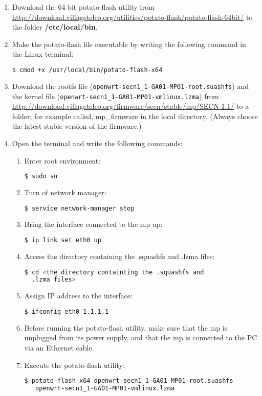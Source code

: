 \begin{enumerate}
\item Download the 64 bit potato-flash utility from \url{http://download.villagetelco.org/utilities/potato-flash/potato-flash-64bit/} to the folder \textbf{/etc/local/bin}.
\item Make the potato-flash file executable by writing the following command in the Linux terminal:
\begin{lstlisting}[language=bash]
  $ cmod +x /usr/local/bin/potato-flash-x64
\end{lstlisting}
\item Download the rootfs file (\texttt{openwrt-secn1_1-GA01-MP01-root.suashfs}) and the kernel file (\texttt{openwrt-secn1_1-GA01-MP01-vmlinux.lzma})  from \url{http://download.villagetelco.org/firmware/secn/stable/mp/SECN-1.1/} to a folder, for example called, mp\_firmware in the local directory. (Always choose the latest stable version of the firmware.)
\item Open the terminal and write the following commands: 
\begin{enumerate}
\item Enter root environment:
\noindent
\begin{lstlisting}[language=bash]
  $ sudo su
\end{lstlisting}

\item Turn of network manager:
\noindent 
\begin{lstlisting}[language=bash]
  $ service network-manager stop
\end{lstlisting}

\item Bring the interface connected to the \gls{mp} up:
\noindent 
\begin{lstlisting}[language=bash]
  $ ip link set eth0 up
\end{lstlisting}

\item Access the directory containing the .squashfs and .lzma files:
\noindent 
\begin{lstlisting}[language=bash]
  $ cd <the directory containting the .squashfs and 
  .lzma files>
\end{lstlisting}

\item Assign IP address to the interface:
\noindent 
\begin{lstlisting}[language=bash]
  $ ifconfig eth0 1.1.1.1
\end{lstlisting}

\item Before running the potato-flash utility, make sure that the \gls{mp} is unplugged from its power supply, and that the \gls{mp} is connected to the PC via an Ethernet cable. 

\item Execute the potato-flash utility:
\noindent
\begin{lstlisting}[language=bash]
  $ potato-flash-x64 openwrt-secn1_1-GA01-MP01-root.suashfs 
   openwrt-secn1_1-GA01-MP01-vmlinux.lzma
\end{lstlisting}
\end{enumerate}
\end{enumerate}

